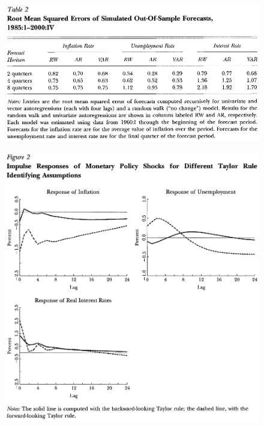 \documentclass{beamer}
\begin{document}
\begin{frame}
  \begin{figure}
    \includegraphics[scale=.7]{stock_watson3.eps}
  \end{figure}
\end{frame}


\begin{frame}
  \begin{figure}
    \includegraphics[scale=.5]{stock_watson4.eps}
  \end{figure}
\end{frame}
\end{document}
